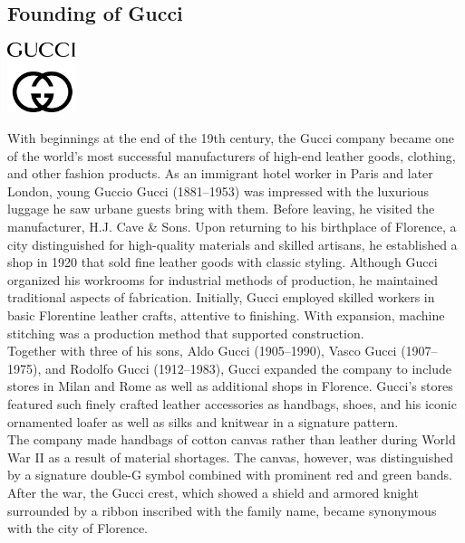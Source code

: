 \documentclass[11pt]{report}
\begin{document}
\section{}
\subsection{Founding of Gucci}
\vspace{2mm}\begin{center}\includegraphics[width=2cm]{./img/gucciLogo.jpg}\end{center}
With beginnings at the end of the 19th century, the Gucci company became one of the world’s most successful manufacturers of high-end leather goods, clothing, and other fashion products. As an immigrant hotel worker in Paris and later London, young Guccio Gucci (1881–1953) was impressed with the luxurious luggage he saw urbane guests bring with them. Before leaving, he visited the manufacturer, H.J. Cave \& Sons. Upon returning to his birthplace of Florence, a city distinguished for high-quality materials and skilled artisans, he established a shop in 1920 that sold fine leather goods with classic styling. Although Gucci organized his workrooms for industrial methods of production, he maintained traditional aspects of fabrication. Initially, Gucci employed skilled workers in basic Florentine leather crafts, attentive to finishing. With expansion, machine stitching was a production method that supported construction.\\
\indent Together with three of his sons, Aldo Gucci (1905–1990), Vasco Gucci (1907–1975), and Rodolfo Gucci (1912–1983), Gucci expanded the company to include stores in Milan and Rome as well as additional shops in Florence. Gucci's stores featured such finely crafted leather accessories as handbags, shoes, and his iconic ornamented loafer as well as silks and knitwear in a signature pattern.\\
\indent The company made handbags of cotton canvas rather than leather during World War II as a result of material shortages. The canvas, however, was distinguished by a signature double-G symbol combined with prominent red and green bands. After the war, the Gucci crest, which showed a shield and armored knight surrounded by a ribbon inscribed with the family name, became synonymous with the city of Florence.
\end{document}
